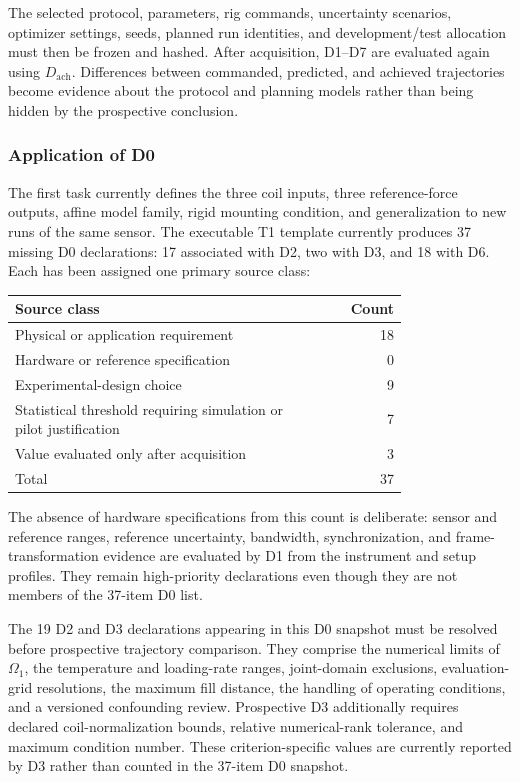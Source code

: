 \documentclass[11pt,a4paper]{article}
\begin{document}
The selected protocol, parameters, rig commands, uncertainty scenarios,
optimizer settings, seeds, planned run identities, and development/test
allocation must then be frozen and hashed. After acquisition, D1--D7 are
evaluated again using $D_{\mathrm{ach}}$. Differences between commanded,
predicted, and achieved trajectories become evidence about the protocol and
planning models rather than being hidden by the prospective conclusion.

\subsubsection{Application of D0}

The first task currently defines the three coil inputs, three reference-force
outputs, affine model family, rigid mounting condition, and generalization to
new runs of the same sensor. The executable T1 template currently produces 37
missing D0 declarations: 17 associated with D2, two with D3, and 18 with D6.
Each has been assigned one primary source class:
\begin{center}
\begin{tabular}{p{0.78\linewidth}r}
\hline
Source class & Count \\
\hline
Physical or application requirement & 18 \\
Hardware or reference specification & 0 \\
Experimental-design choice & 9 \\
Statistical threshold requiring simulation or pilot justification & 7 \\
Value evaluated only after acquisition & 3 \\
\hline
Total & 37 \\
\hline
\end{tabular}
\end{center}

The absence of hardware specifications from this count is deliberate: sensor
and reference ranges, reference uncertainty, bandwidth, synchronization, and
frame-transformation evidence are evaluated by D1 from the instrument and
setup profiles. They remain high-priority declarations even though they are
not members of the 37-item D0 list.

The 19 D2 and D3 declarations appearing in this D0 snapshot must be resolved
before prospective trajectory comparison. They comprise the numerical limits
of $\Omega_1$, the temperature and loading-rate ranges, joint-domain
exclusions, evaluation-grid resolutions, the maximum fill distance, the
handling of operating conditions, and a versioned confounding review.
Prospective D3 additionally requires declared coil-normalization bounds,
relative numerical-rank tolerance, and maximum condition number. These
criterion-specific values are currently reported by D3 rather than counted in
the 37-item D0 snapshot.
\end{document}

